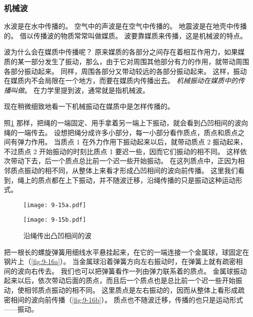 \subsubsection{机械波} 
水波是在水中传播的。
空气中的声波是在空气中传播的。
地震波是在地壳中传播的。
借以传播波的物质常常叫做媒质。
波要靠媒质来传播，这是机械波的特点。

波为什么会在媒质中传播呢？
原来媒质的各部分之间存在着相互作用力，如果媒质的某一部分发生了振动，那么，由于它对周围其他部分有力的作用，就带动周围各部分振动起来。
同样，周围各部分又带动较远的各部分振动起来。
这样，振动在媒质内不会局限在一个地方，而要在媒质内传播出去。
\emph{机械振动在媒质中的传播叫做}。
在力学里提到波，通常就是指机械波。

现在稍微细致地看一下机械振动在媒质中是怎样传播的。

照\cref{fig:9-15} 那样，把绳的一端固定、用手拿着另一端上下振动，就会看到凸凹相间的波向绳的一端传去。
设想把绳分成许多小部分，每一小部分看作质点，质点和质点之间有弹力作用。
当质点 1 在外力作用下振动起来以后，就带动质点 2 振动起来，不过质点 2 开始振动的时刻比质点 1 要迟一些，因而它们振动的相不同。
这样依次带动下去，后一个质点总比前一个迟一些开始振动。
在这列质点中，正因为相邻质点振动的相不同，从整体上来看才形成凸凹相间的波向前传播。
这里我们看到，绳上的质点都在上下振动，并不随波迁移，沿绳传播的只是振动这种运动形式。

\begin{figure}
  \begin{minipage}{0.08\linewidth}
    \subcaption{}\label{fig:9-15a}
  \end{minipage}%
  \begin{minipage}{0.92\linewidth}
    \texttt{[image: 9-15a.pdf]}
  \end{minipage}
  \par\bigskip
  \begin{minipage}{0.08\linewidth}
    \subcaption{}\label{fig:9-15b}
  \end{minipage}%
  \begin{minipage}{0.92\linewidth}
    \texttt{[image: 9-15b.pdf]}
  \end{minipage}
  \caption{沿绳传出凸凹相间的波}\label{fig:9-15}
\end{figure}

把一根长的螺旋弹簧用细线水平悬挂起来，在它的一端连接一个金属球，球固定在钢片上（\cref{fig:9-16a}）。
当金属球沿着弹簧方向左右振动时，在弹簧上就有疏密相间的波向右传去。
我们也可以把弹簧看作一列由弹力联系着的质点。
金属球振动起来以后，依次带动后面的质点，而且后一个质点也是总比前一个迟一些开始振动，使相邻质点振动的相不同。
这里质点是左右振动的，因而从整体上看形成疏密相间的波向前传播（\cref{fig:9-16b}）。
质点也不随波迁移，传播的也只是运动形式——振动。

